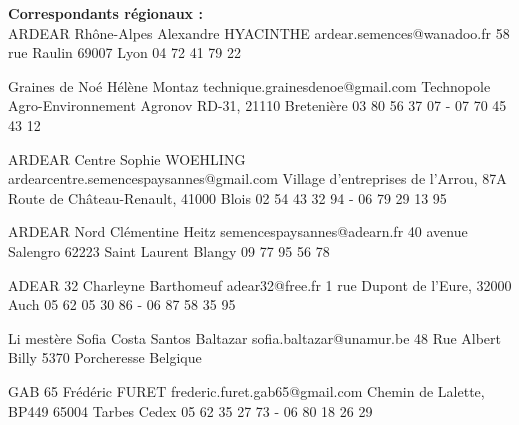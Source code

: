 \vfill

\newpage

\noindent\textbf{\textsf{Correspondants régionaux :}} \\

ARDEAR Rhône-Alpes	
Alexandre HYACINTHE
ardear.semences@wanadoo.fr
58 rue Raulin	69007	Lyon
04 72 41 79 22	

Graines de Noé
Hélène Montaz
technique.grainesdenoe@gmail.com
Technopole Agro-Environnement
Agronov RD-31, 21110	Bretenière
03 80 56 37 07 - 07 70 45 43 12

ARDEAR Centre	
Sophie WOEHLING	
ardearcentre.semencespaysannes@gmail.com		
Village d'entreprises de l'Arrou, 87A Route de Château-Renault,	41000	Blois
02 54 43 32 94 - 06 79 29 13 95

ARDEAR Nord	Clémentine Heitz	
semencespaysannes@adearn.fr		
40 avenue Salengro	62223	Saint Laurent Blangy	
09 77 95 56 78	

ADEAR 32	Charleyne Barthomeuf	
adear32@free.fr		
1 rue Dupont de l'Eure,	32000	Auch	
05 62 05 30 86 - 06 87 58 35 95

Li mestère	
Sofia Costa Santos Baltazar	
sofia.baltazar@unamur.be		
48 Rue Albert Billy	5370	Porcheresse	Belgique	

GAB 65	
Frédéric FURET	
frederic.furet.gab65@gmail.com		
Chemin de Lalette, BP449	65004	Tarbes Cedex
05 62 35 27 73 - 06 80 18 26 29

\vfill



